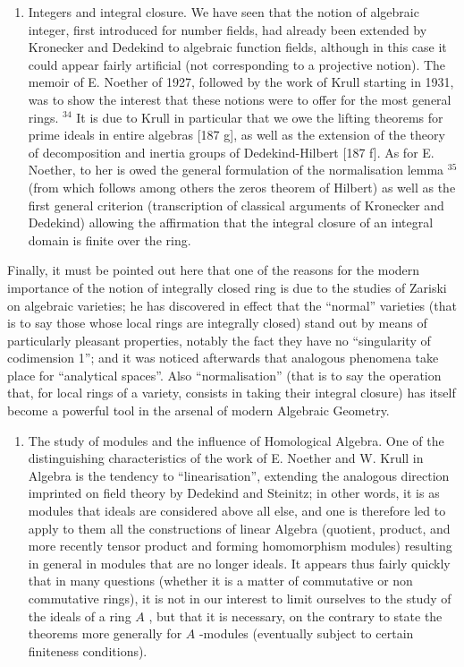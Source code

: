 \begin{enumerate}
\def\labelenumi{\Alph{enumi})}
\setcounter{enumi}{2}
\tightlist
\item
  Integers and integral closure. We have seen that the notion of algebraic integer, first introduced for number fields, had already been extended by Kronecker and Dedekind to algebraic function fields, although in this case it could appear fairly artificial (not corresponding to a projective notion). The memoir of E. Noether of 1927, followed by the work of Krull starting in 1931, was to show the interest that these notions were to offer for the most general rings. \(^{34}\) It is due to Krull in particular that we owe the lifting theorems for prime ideals in entire algebras {[}187 g{]}, as well as the extension of the theory of decomposition and inertia groups of Dedekind-Hilbert {[}187 f{]}. As for E. Noether, to her is owed the general formulation of the normalisation lemma \(^{35}\) (from which follows among others the zeros theorem of Hilbert) as well as the first general criterion (transcription of classical arguments of Kronecker and Dedekind) allowing the affirmation that the integral closure of an integral domain is finite over the ring.
\end{enumerate}

Finally, it must be pointed out here that one of the reasons for the modern importance of the notion of integrally closed ring is due to the studies of Zariski on algebraic varieties; he has discovered in effect that the ``normal'' varieties (that is to say those whose local rings are integrally closed) stand out by means of particularly pleasant properties, notably the fact they have no ``singularity of codimension 1''; and it was noticed afterwards that analogous phenomena take place for ``analytical spaces''. Also ``normalisation'' (that is to say the operation that, for local rings of a variety, consists in taking their integral closure) has itself become a powerful tool in the arsenal of modern Algebraic Geometry.

\begin{enumerate}
\def\labelenumi{\Alph{enumi})}
\setcounter{enumi}{3}
\tightlist
\item
  The study of modules and the influence of Homological Algebra. One of the distinguishing characteristics of the work of E. Noether and W. Krull in Algebra is the tendency to ``linearisation'', extending the analogous direction imprinted on field theory by Dedekind and Steinitz; in other words, it is as modules that ideals are considered above all else, and one is therefore led to apply to them all the constructions of linear Algebra (quotient, product, and more recently tensor product and forming homomorphism modules) resulting in general in modules that are no longer ideals. It appears thus fairly quickly that in many questions (whether it is a matter of commutative or non commutative rings), it is not in our interest to limit ourselves to the study of the ideals of a ring \(A\) , but that it is necessary, on the contrary to state the theorems more generally for \(A\) -modules (eventually subject to certain finiteness conditions).
\end{enumerate}

